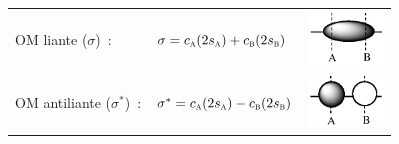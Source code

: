\begin{tabular}{lll}
OM liante ($\sigma$)~: &
$\sigma =  c_\textsc{a} (2s_\textsc{a}) + c_\textsc{b}(2s_\textsc{b})$ &
\includegraphics[width=2.0cm]{figure/sigma.eps} \\[0.5cm]
OM antiliante ($\sigma^*$)~: &
$\sigma^* = c_\textsc{a} (2s_\textsc{a}) - c_\textsc{b}(2s_\textsc{b})$ &
\includegraphics[width=2.0cm]{figure/sigma_star.eps} \\
\end{tabular}

